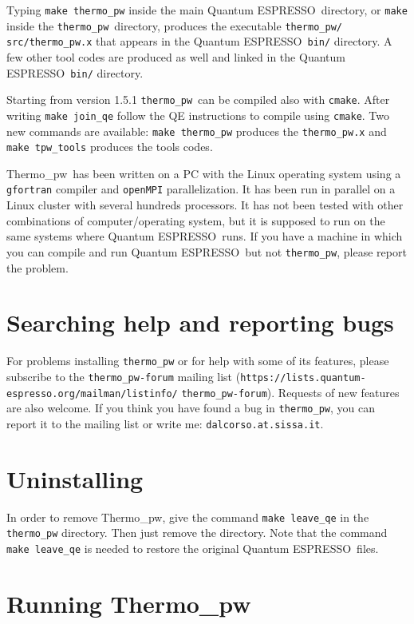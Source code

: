 \documentclass[12pt,a4paper,twoside]{report}
\def\qe{{\sc Quantum ESPRESSO}}
\def\thermo{{\sc Thermo}\_{\sc pw}}
\begin{document}
Typing \texttt{make thermo\_pw} inside the main \qe\ directory, 
or \texttt{make} 
inside the \texttt{thermo\_pw}\ directory, produces the executable
\texttt{thermo\_pw/} \texttt{src/thermo\_pw.x} that appears in the 
\qe\ \texttt{bin/} directory. A few other tool codes are produced as well
and linked in the \qe\ \texttt{bin/} directory.

Starting from version 1.5.1 \texttt{thermo\_pw}\ can be compiled also
with \texttt{cmake}. After writing \texttt{make join\_qe} follow the 
QE instructions to compile using \texttt{cmake}. Two new commands are
available: \texttt{make thermo\_pw} produces the \texttt{thermo\_pw.x}  
and \texttt{make tpw\_tools} produces the tools codes.

\thermo\ has been written on a PC with the Linux operating system using a
\texttt{gfortran} compiler and \texttt{openMPI} parallelization. It has
been run in parallel on a Linux cluster with several hundreds processors.
It has not been tested with other combinations of computer/operating system, 
but it is supposed to run on the same systems where \qe\ runs. If
you have a machine in which you can compile and run \qe\ but not 
\texttt{thermo\_pw}, please report the problem.

\newpage
{\color{coral}\section{Searching help and reporting bugs}}
\color{black}
For problems installing \texttt{thermo\_pw} or for help
with some of its features, please subscribe to the \texttt{thermo\_pw-forum}
mailing list 
(\texttt{https://lists.quantum-} \texttt{espresso.org/mailman/listinfo/}
\texttt{thermo\_pw-forum}). 
Requests of new features are also welcome. If you think you have
found a bug 
in \texttt{thermo\_pw}, you can report it to the mailing list or 
write me: \texttt{dalcorso.at.sissa.it}.

\newpage
{\color{coral}\section{Uninstalling}}
\color{black}

In order to remove \thermo, give the command \texttt{make leave\_qe} in the
\texttt{thermo\_pw} directory. Then just remove the directory. Note that 
the command \texttt{make leave\_qe} is needed to restore the original \qe\ files.

\newpage
{\color{coral}\section{Running \thermo}}
\color{black}
\end{document}
